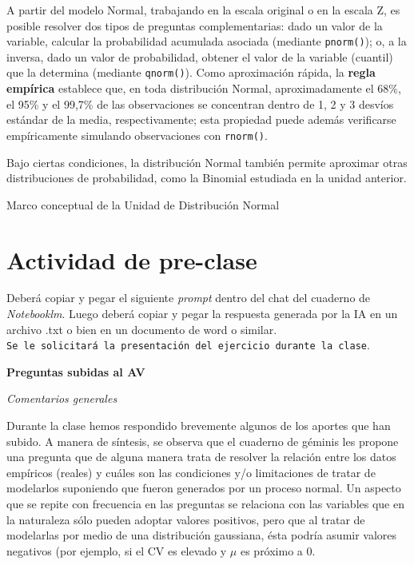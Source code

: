 \documentclass[
  spanish,
  letterpaper,
  DIV=11,
  numbers=noendperiod]{scrreprt}
\begin{document}
A partir del modelo Normal, trabajando en la escala original o en la
escala Z, es posible resolver dos tipos de preguntas complementarias:
dado un valor de la variable, calcular la probabilidad acumulada
asociada (mediante \texttt{pnorm()}); o, a la inversa, dado un valor de
probabilidad, obtener el valor de la variable (cuantil) que la determina
(mediante \texttt{qnorm()}). Como aproximación rápida, la \textbf{regla
empírica} establece que, en toda distribución Normal, aproximadamente el
68\%, el 95\% y el 99,7\% de las observaciones se concentran dentro de
1, 2 y 3 desvíos estándar de la media, respectivamente; esta propiedad
puede además verificarse empíricamente simulando observaciones con
\texttt{rnorm()}.

Bajo ciertas condiciones, la distribución Normal también permite
aproximar otras distribuciones de probabilidad, como la Binomial
estudiada en la unidad anterior.

Marco conceptual de la Unidad de Distribución Normal

\section{\texorpdfstring{\textbf{Actividad de
pre-clase}}{Actividad de pre-clase}}\label{actividad-de-pre-clase-1}

Deberá copiar y pegar el siguiente \emph{prompt} dentro del chat del
cuaderno de \emph{Notebooklm}. Luego deberá copiar y pegar la respuesta
generada por la IA en un archivo .txt o bien en un documento de word o
similar.
\texttt{Se\ le\ solicitará\ la\ presentación\ del\ ejercicio\ durante\ la\ clase}.

\textbf{Preguntas subidas al AV}

\emph{Comentarios generales}

Durante la clase hemos respondido brevemente algunos de los aportes que
han subido. A manera de síntesis, se observa que el cuaderno de géminis
les propone una pregunta que de alguna manera trata de resolver la
relación entre los datos empíricos (reales) y cuáles son las condiciones
y/o limitaciones de tratar de modelarlos suponiendo que fueron generados
por un proceso normal. Un aspecto que se repite con frecuencia en las
preguntas se relaciona con las variables que en la naturaleza sólo
pueden adoptar valores positivos, pero que al tratar de modelarlas por
medio de una distribución gaussiana, ésta podría asumir valores
negativos (por ejemplo, si el CV es elevado y \(\mu\) es próximo a 0.
\end{document}
